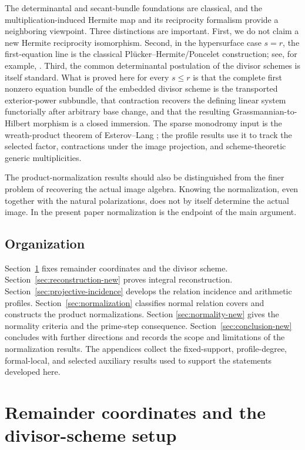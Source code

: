 \documentclass[10pt,fleqn]{article}
\numberwithin{equation}{section}
\begin{document}
The determinantal and secant-bundle foundations are classical, and the
multiplication-induced Hermite map and its reciprocity formalism provide a
neighboring viewpoint.  Three distinctions are important.  First, we do not
claim a new Hermite reciprocity isomorphism.  Second, in the hypersurface case
\(s=r\), the first-equation line is the classical
Pl\"ucker--Hermite/Poncelet construction; see, for example,
\cite[Section~3.2]{IlardiSupinoValles}.  Third, the common determinantal
postulation of the divisor schemes is itself standard.  What is proved here
for every \(s\le r\) is that the complete first nonzero equation bundle of
the embedded divisor scheme is the transported exterior-power subbundle,
that contraction recovers the defining linear system functorially after
arbitrary base change, and that the resulting Grassmannian-to-Hilbert
morphism is a closed immersion.  The sparse monodromy input is the
wreath-product theorem of Esterov--Lang \cite{EsterovLang}; the profile
results use it to track the selected factor, contractions under the image
projection, and scheme-theoretic generic multiplicities.

The product-normalization results should also be distinguished from the
finer problem of recovering the actual image algebra.  Knowing the
normalization, even together with the natural polarizations, does not by
itself determine the actual image.  In the present paper normalization is the
endpoint of the main argument.

\subsection{Organization}

Section~\ref{sec:remainders-new} fixes remainder coordinates and the divisor
scheme.  Section~\ref{sec:reconstruction-new} proves integral reconstruction.
Section~\ref{sec:projective-incidence} develops the relation incidence and
arithmetic profiles.  Section~\ref{sec:normalization} classifies normal
relation covers and constructs the product normalizations.  Section
\ref{sec:normality-new} gives the normality criteria and the prime-step
consequence.  Section~\ref{sec:conclusion-new} concludes with further directions and
records the scope and limitations of the normalization results.  The
appendices collect the fixed-support, profile-degree, formal-local, and
selected auxiliary results used to support the statements developed here.
\section{Remainder coordinates and the divisor-scheme setup}\label{sec:remainders-new}\label{sec:preliminaries}
\end{document}
